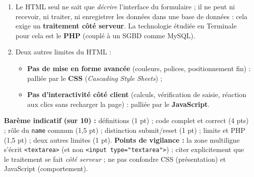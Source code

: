 \documentclass[11pt]{article}
\begin{document}
\begin{corrige}
\begin{enumerate}
\item Le HTML seul ne sait que \emph{décrire} l'interface du formulaire ; il ne peut ni recevoir, ni traiter, ni enregistrer les données dans une base de données : cela exige un \textbf{traitement côté serveur}. La technologie étudiée en Terminale pour cela est le \textbf{PHP} (couplé à un SGBD comme MySQL).
\item Deux autres limites du HTML :
\begin{itemize}
\item \textbf{Pas de mise en forme avancée} (couleurs, polices, positionnement fin) : palliée par le \textbf{CSS} (\emph{Cascading Style Sheets}) ;
\item \textbf{Pas d'interactivité côté client} (calculs, vérification de saisie, réaction aux clics sans recharger la page) : palliée par le \textbf{JavaScript}.
\end{itemize}
\end{enumerate}
\textbf{Barème indicatif (sur 10) :} définitions (1 pt) ; code complet et correct (4 pts) ; rôle du \texttt{name} commun (1,5 pt) ; distinction submit/reset (1 pt) ; limite et PHP (1,5 pt) ; deux autres limites (1 pt).
\textbf{Points de vigilance :} la zone multiligne s'écrit \texttt{<textarea>} (et non \texttt{<input type="textarea">}) ; citer explicitement que le traitement se fait \emph{côté serveur} ; ne pas confondre CSS (présentation) et JavaScript (comportement).
\end{corrige}
\end{document}
